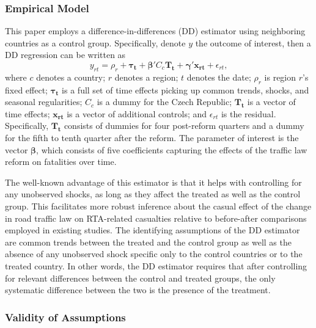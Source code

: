 \documentclass[12pt]{article}
\begin{document}
\subsubsection{Empirical Model} %

This paper employs a difference-in-differences (DD) estimator using neighboring
countries as a control group. Specifically, denote $y$ the outcome of interest,
then a DD regression can be written as \begin{equation} \label{eq:DD} y_{rt} =
\rho_{r} + \boldsymbol{\tau_{t}} + \boldsymbol{\beta'}C_c\boldsymbol{T_{t}} +
\boldsymbol{\gamma'}\boldsymbol{x_{rt}} + \epsilon_{rt}, \end{equation} where
$c$ denotes a country; $r$ denotes a region; $t$ denotes the date; $\rho_{r}$ is
region $r$'s fixed effect; $\boldsymbol{\tau_{t}}$ is a full set of time effects
picking up common trends, shocks, and seasonal regularities; $C_c$ is a dummy
for the Czech Republic; $\boldsymbol{T_t}$ is a vector of time effects;
$\boldsymbol{x_{rt}}$ is a vector of additional controls; and $\epsilon_{rt}$ is
the residual.  Specifically, $\boldsymbol{T_t}$ consists of dummies for four
post-reform quarters and a dummy for the fifth to tenth quarter after the
reform.  The parameter of interest is the vector $\boldsymbol{\beta}$, which
consists of five coefficients capturing the effects of the traffic law reform on
fatalities over time.

The well-known advantage of this estimator is that it helps with controlling for
any unobserved shocks, as long as they affect the treated as well as the control
group. This facilitates more robust inference about the casual effect of the
change in road traffic law on RTA-related casualties relative to before-after
comparisons employed in existing studies. The identifying assumptions of the DD
estimator are common trends between the treated and the control group as well as
the absence of any unobserved shock specific only to the control countries or to
the treated country. In other words, the DD estimator requires that after
controlling for relevant differences between the control and treated groups, the
only systematic difference between the two is the presence of the treatment. 

\subsubsection{Validity of Assumptions} %
\end{document}
